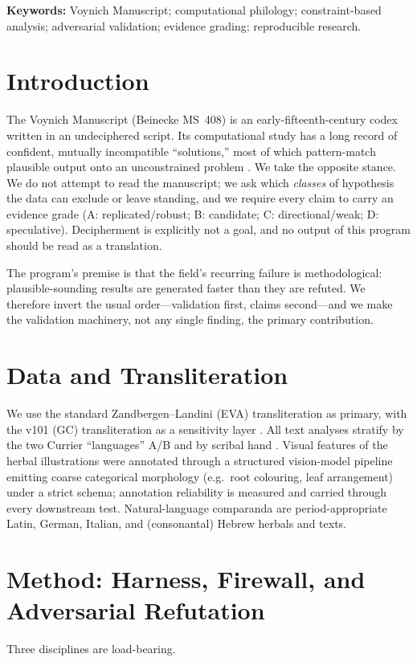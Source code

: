 \documentclass[11pt]{article}
\begin{document}
\noindent\textbf{Keywords:} Voynich Manuscript; computational philology;
constraint-based analysis; adversarial validation; evidence grading; reproducible
research.

\section{Introduction}
The Voynich Manuscript (Beinecke MS~408) is an early-fifteenth-century codex written
in an undeciphered script. Its computational study has a long record of confident,
mutually incompatible ``solutions,'' most of which pattern-match plausible output onto
an unconstrained problem \citep{reddy2011know,bowern2021linguistics}. We take the
opposite stance. We do not attempt to read the manuscript; we ask which \emph{classes}
of hypothesis the data can exclude or leave standing, and we require every claim to
carry an evidence grade (A: replicated/robust; B: candidate; C: directional/weak; D:
speculative). Decipherment is explicitly not a goal, and no output of this program
should be read as a translation.

The program's premise is that the field's recurring failure is methodological:
plausible-sounding results are generated faster than they are refuted. We therefore
invert the usual order---validation first, claims second---and we make the validation
machinery, not any single finding, the primary contribution.

\section{Data and Transliteration}
We use the standard Zandbergen--Landini (EVA) transliteration as primary, with the
v101 (GC) transliteration as a sensitivity layer \citep{zandbergen_voynichnu}. All
text analyses stratify by the two Currier ``languages'' A/B \citep{currier1976} and by
scribal hand \citep{fagindavis2020hands}. Visual features of the herbal illustrations
were annotated through a structured vision-model pipeline emitting coarse categorical
morphology (e.g.\ root colouring, leaf arrangement) under a strict schema; annotation
reliability is measured and carried through every downstream test. Natural-language
comparanda are period-appropriate Latin, German, Italian, and (consonantal) Hebrew
herbals and texts.

\section{Method: Harness, Firewall, and Adversarial Refutation}
Three disciplines are load-bearing.
\end{document}
